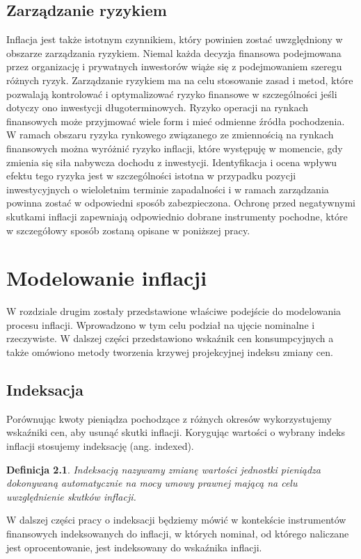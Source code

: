 \documentclass{mini}
\theoremstyle{mythstyle}
\newtheorem{Definicja}{Definicja}[chapter]
\begin{document}
	\section{Zarządzanie ryzykiem}
	
	Inflacja jest także istotnym czynnikiem, który powinien zostać uwzględniony w obszarze zarządzania ryzykiem. Niemal każda decyzja finansowa podejmowana przez organizację i prywatnych inwestorów wiąże się z podejmowaniem szeregu różnych ryzyk. Zarządzanie ryzykiem ma na celu stosowanie zasad i metod, które pozwalają kontrolować i optymalizować ryzyko finansowe w szczególności jeśli dotyczy ono inwestycji długoterminowych. Ryzyko operacji na rynkach finansowych może przyjmować wiele form i mieć odmienne źródła pochodzenia. W ramach obszaru  ryzyka rynkowego związanego ze zmiennością na rynkach finansowych można wyróżnić ryzyko inflacji, które występuję w momencie, gdy zmienia się siła nabywcza dochodu z inwestycji. Identyfikacja i ocena wpływu efektu tego ryzyka jest w szczególności istotna w przypadku pozycji inwestycyjnych o wieloletnim terminie zapadalności i w ramach zarządzania powinna zostać w odpowiedni sposób zabezpieczona. Ochronę przed negatywnymi skutkami inflacji zapewniają odpowiednio dobrane instrumenty pochodne, które w szczegółowy sposób zostaną opisane w poniższej pracy.
	
\chapter{Modelowanie inflacji}

	W rozdziale drugim zostały przedstawione właściwe podejście do modelowania procesu inflacji. Wprowadzono w tym celu podział na ujęcie nominalne i rzeczywiste. W dalszej części przedstawiono wskaźnik cen konsumpcyjnych a także omówiono metody tworzenia krzywej projekcyjnej indeksu zmiany cen.
	\section{Indeksacja}
	Porównując kwoty pieniądza pochodzące z różnych okresów wykorzystujemy wskaźniki cen, aby usunąć skutki inflacji. Korygując wartości  o wybrany indeks inflacji stosujemy indeksację (ang. indexed).
	\begin{Definicja}
		Indeksacją nazywamy zmianę wartości jednostki pieniądza dokonywaną automatycznie na mocy umowy prawnej mającą na celu uwzględnienie skutków inflacji.
	\end{Definicja}
	W dalszej części pracy o indeksacji będziemy mówić w kontekście instrumentów finansowych indeksowanych do inflacji, w których nominał, od którego naliczane jest oprocentowanie, jest indeksowany do wskaźnika inflacji.
\end{document}

